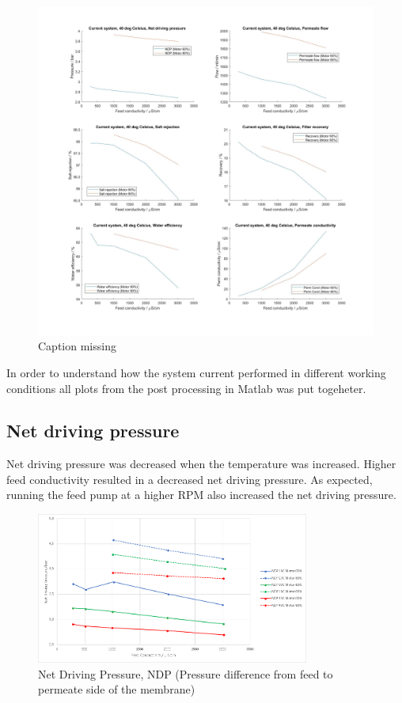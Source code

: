 \begin{figure}[H]
    \centering
    \includegraphics[width=1.1\textwidth]{Key40}
    \caption{Caption missing}
    \label{fig:K40}
\end{figure}

\newpage

In order to understand how the system current performed in different working conditions all plots from the post processing in Matlab was put togeheter. 

\subsection{Net driving pressure}

Net driving pressure was decreased when the temperature was increased. Higher feed conductivity resulted in a decreased net driving pressure. As expected, running the feed pump at a higher RPM also increased the net driving pressure.

\begin{figure}[H]
    \centering
    \includegraphics[width=0.8\textwidth]{NDP}
    \caption{Net Driving Pressure, NDP (Pressure difference from feed to permeate side of the membrane)}
    \label{fig:NDP}
\end{figure}

